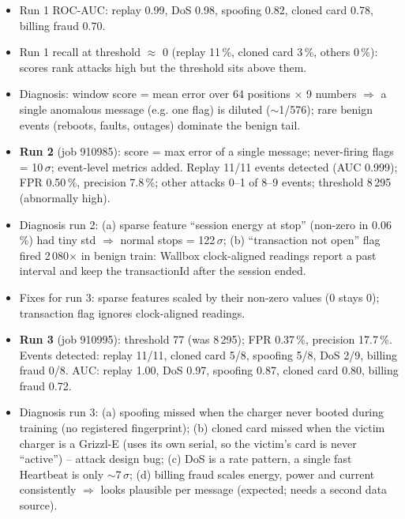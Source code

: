 \documentclass[11pt]{article}
\begin{document}
\begin{itemize}
  \item Run 1 ROC-AUC: replay 0.99, DoS 0.98, spoofing 0.82, cloned card 0.78, billing fraud 0.70.
  \item Run 1 recall at threshold $\approx$ 0 (replay 11\,\%, cloned card 3\,\%, others 0\,\%): scores rank attacks high but the threshold sits above them.
  \item Diagnosis: window score = mean error over 64 positions $\times$ 9 numbers $\Rightarrow$ a single anomalous message (e.g. one flag) is diluted ($\sim$1/576); rare benign events (reboots, faults, outages) dominate the benign tail.
  \item \textbf{Run 2} (job 910985): score = max error of a single message; never-firing flags = 10\,$\sigma$; event-level metrics added. Replay 11/11 events detected (AUC 0.999); FPR 0.50\,\%, precision 7.8\,\%; other attacks 0--1 of 8--9 events; threshold 8\,295 (abnormally high).
  \item Diagnosis run 2: (a) sparse feature ``session energy at stop'' (non-zero in 0.06\,\%) had tiny std $\Rightarrow$ normal stops = 122\,$\sigma$; (b) ``transaction not open'' flag fired 2\,080$\times$ in benign train: Wallbox clock-aligned readings report a past interval and keep the transactionId after the session ended.
  \item Fixes for run 3: sparse features scaled by their non-zero values (0 stays 0); transaction flag ignores clock-aligned readings.
  \item \textbf{Run 3} (job 910995): threshold 77 (was 8\,295); FPR 0.37\,\%, precision 17.7\,\%. Events detected: replay 11/11, cloned card 5/8, spoofing 5/8, DoS 2/9, billing fraud 0/8. AUC: replay 1.00, DoS 0.97, spoofing 0.87, cloned card 0.80, billing fraud 0.72.
  \item Diagnosis run 3: (a) spoofing missed when the charger never booted during training (no registered fingerprint); (b) cloned card missed when the victim charger is a Grizzl-E (uses its own serial, so the victim's card is never ``active'') -- attack design bug; (c) DoS is a rate pattern, a single fast Heartbeat is only $\sim$7\,$\sigma$; (d) billing fraud scales energy, power and current consistently $\Rightarrow$ looks plausible per message (expected; needs a second data source).
\end{itemize}
\end{document}
